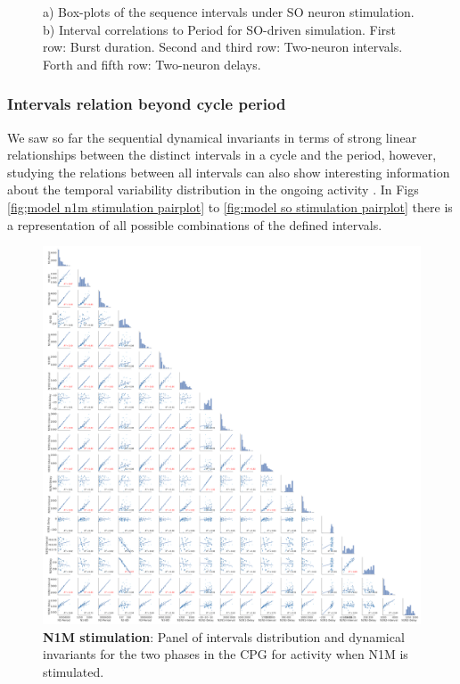\begin{figure}[hbt!]
\begin{minipage}[b]{0.53\textwidth}
\begin{minipage}[b]{\textwidth}
		\end{minipage}
	\end{minipage}
	\caption{a) Box-plots of the sequence intervals under SO neuron stimulation. b) Interval correlations to Period for SO-driven simulation. First row: Burst duration. Second and third row: Two-neuron intervals. Forth and fifth row: Two-neuron delays.}
	\label{fig:invariant so test19}
\end{figure}



\subsubsection{Intervals relation beyond cycle period}
We saw so far the sequential dynamical invariants in terms of strong linear relationships between the distinct intervals in a cycle and the period, however, studying the relations between all intervals can also show interesting information about the temporal variability distribution in the ongoing activity \cite{}. In Figs \ref{fig;model n1m stimulation pairplot} to \ref{fig:model so stimulation pairplot} there is a representation of all possible combinations of the defined intervals. 



\begin{figure}[htbp]
	\centering
	\includegraphics[width=\textwidth]{./invariants/data/MODEL/n1m_driven/images/3phases/_output_pairplot.png}
	\caption{\textbf{N1M stimulation}: Panel of intervals distribution and dynamical invariants for the two phases in the CPG for activity when N1M is stimulated.}
	\label{fig:model n1m stimulation pairplot}
\end{figure}
 


